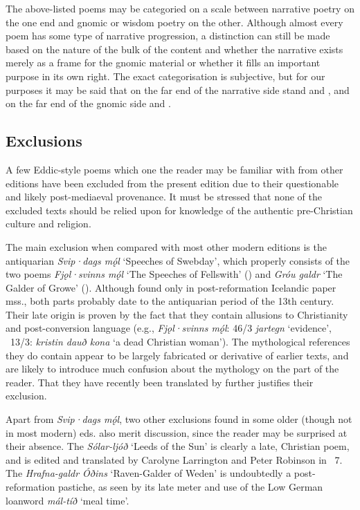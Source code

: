 The above-listed poems may be categoried on a scale between narrative poetry on the one end and gnomic or wisdom poetry on the other.  Although almost every poem has some type of narrative progression, a distinction can still be made based on the nature of the bulk of the content and whether the narrative exists merely as a frame for the gnomic material or whether it fills an important purpose in its own right.  The exact categorisation is subjective, but for our purposes it may be said that on the far end of the narrative side stand  and , and on the far end of the gnomic side  and .

\subsection{Exclusions}

A few Eddic-style poems which one the reader may be familiar with from other editions have been excluded from the present edition due to their questionable and likely post-mediaeval provenance.  It must be stressed that none of the excluded texts should be relied upon for knowledge of the authentic pre-Christian culture and religion.

The main exclusion when compared with most other modern editions is the antiquarian \emph{Svip·dags mǫ́l} ‘Speeches of Swebday’, which properly consists of the two poems \emph{Fjǫl·svinns mǫ́l} ‘The Speeches of Fellswith’ (\Fjolsvinnsmal) and \emph{Gróu galdr} ‘The Galder of Growe’ (\Grougaldr).
Although found only in post-reformation Icelandic paper mss., both parts probably date to the antiquarian period of the 13th century.  Their late origin is proven by the fact that they contain allusions to Christianity and post-conversion language (e.g., \emph{Fjǫl·svinns mǫ́l}: 46/3 \emph{jartegn} ‘evidence’, \Grougaldr\ 13/3: \emph{kristin dauð kona} ‘a dead Christian woman’).
The mythological references they do contain appear to be largely fabricated or derivative of earlier texts, and are likely to introduce much confusion about the mythology on the part of the reader.  That they have recently been translated by \textcite{PettitEdda} further justifies their exclusion.

Apart from \emph{Svip·dags mǫ́l}, two other exclusions found in some older (though not in most modern) eds. also merit discussion, since the reader may be surprised at their absence.  The \emph{Sólar-ljóð} ‘Leeds of the Sun’ is clearly a late, Christian poem, and is edited and translated by Carolyne Larrington and Peter Robinson in \Skp\ 7.  The \emph{Hrafna-galdr Óðins} ‘Raven-Galder of Weden’ is undoubtedly a post-reformation pastiche, as seen by its late meter and use of the Low German loanword \emph{mál-tíð} ‘meal time’.

